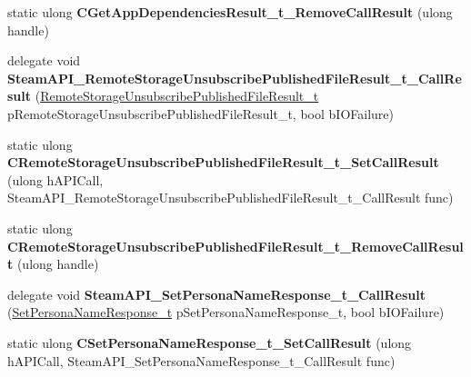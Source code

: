 \begin{DoxyCompactItemize}
\mbox{\label{class_valve_1_1_interop_1_1_native_entrypoints_a5aaa55eec64a1cbb7235c9727b25ecd6}} 
static ulong {\bfseries C\+Get\+App\+Dependencies\+Result\+\_\+t\+\_\+\+Remove\+Call\+Result} (ulong handle)
\item 
\mbox{\label{class_valve_1_1_interop_1_1_native_entrypoints_aada5194d71a0e4b8b799c12ff169a0b1}} 
delegate void {\bfseries Steam\+A\+P\+I\+\_\+\+Remote\+Storage\+Unsubscribe\+Published\+File\+Result\+\_\+t\+\_\+\+Call\+Result} (\hyperlink{struct_valve_1_1_steamworks_1_1_remote_storage_unsubscribe_published_file_result__t}{Remote\+Storage\+Unsubscribe\+Published\+File\+Result\+\_\+t} p\+Remote\+Storage\+Unsubscribe\+Published\+File\+Result\+\_\+t, bool b\+I\+O\+Failure)
\item 
\mbox{\label{class_valve_1_1_interop_1_1_native_entrypoints_ae2be080ae1a14c40b8d8ab4074d4d4bc}} 
static ulong {\bfseries C\+Remote\+Storage\+Unsubscribe\+Published\+File\+Result\+\_\+t\+\_\+\+Set\+Call\+Result} (ulong h\+A\+P\+I\+Call, Steam\+A\+P\+I\+\_\+\+Remote\+Storage\+Unsubscribe\+Published\+File\+Result\+\_\+t\+\_\+\+Call\+Result func)
\item 
\mbox{\label{class_valve_1_1_interop_1_1_native_entrypoints_ac65b93c0510dc31ef765a8adbbe29e95}} 
static ulong {\bfseries C\+Remote\+Storage\+Unsubscribe\+Published\+File\+Result\+\_\+t\+\_\+\+Remove\+Call\+Result} (ulong handle)
\item 
\mbox{\label{class_valve_1_1_interop_1_1_native_entrypoints_a9ec82c0c77c054a6878f4f1866318701}} 
delegate void {\bfseries Steam\+A\+P\+I\+\_\+\+Set\+Persona\+Name\+Response\+\_\+t\+\_\+\+Call\+Result} (\hyperlink{struct_valve_1_1_steamworks_1_1_set_persona_name_response__t}{Set\+Persona\+Name\+Response\+\_\+t} p\+Set\+Persona\+Name\+Response\+\_\+t, bool b\+I\+O\+Failure)
\item 
\mbox{\label{class_valve_1_1_interop_1_1_native_entrypoints_a3c5a095a35bc15ee7cb637efb1acbfed}} 
static ulong {\bfseries C\+Set\+Persona\+Name\+Response\+\_\+t\+\_\+\+Set\+Call\+Result} (ulong h\+A\+P\+I\+Call, Steam\+A\+P\+I\+\_\+\+Set\+Persona\+Name\+Response\+\_\+t\+\_\+\+Call\+Result func)

\end{DoxyCompactItemize}
